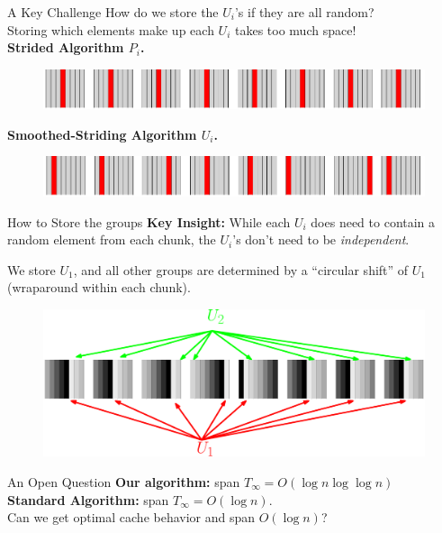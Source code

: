 \documentclass[xcolor=x11names, svgnames, rgb]{beamer}
\begin{document}
\begin{frame}[t]{A Key Challenge}
How do we store the $U_i$'s if they are all random?	\\
\vspace{0.5cm}
Storing which elements make up each $U_i$ takes too much space!\\

\vspace{0.5cm}
\textbf{Strided Algorithm $P_i$.}
\begin{figure}
	\includegraphics[width=\linewidth]{imgs/stridedAlgHighlighted.png}
\end{figure}
\textbf{Smoothed-Striding Algorithm $U_i$.}
\begin{figure}
	\includegraphics[width=\linewidth]{imgs/smoothedStridingAlgHighlighted.png}
\end{figure}
\end{frame}

\begin{frame}[t]{How to Store the groups}
	\textbf{Key Insight:} While each $U_i$ does need to contain a random element from each chunk, the $U_i$'s don't need to be \emph{independent}.

	\vspace{0.5cm}
	We store $U_1$, and all other groups are determined by a
  ``circular shift'' of $U_1$ (wraparound within each chunk).
	\vspace{0.5cm}
	\begin{figure}
		\includegraphics[width=\linewidth]{imgs/blackrainbowAlt.eps}
	\end{figure}	
\end{frame}

\begin{frame}[t]{An Open Question}
	\vspace{0.5cm}
	\textbf{Our algorithm:} span $T_\infty = O(\log n \log\log n)$\\
	\vspace{0.5cm}
	\textbf{Standard Algorithm:} span $T_\infty = O(\log n)$.\\
	\vspace{1cm}
	Can we get optimal cache behavior and span $O(\log n)$?
\end{frame}
\end{document}
